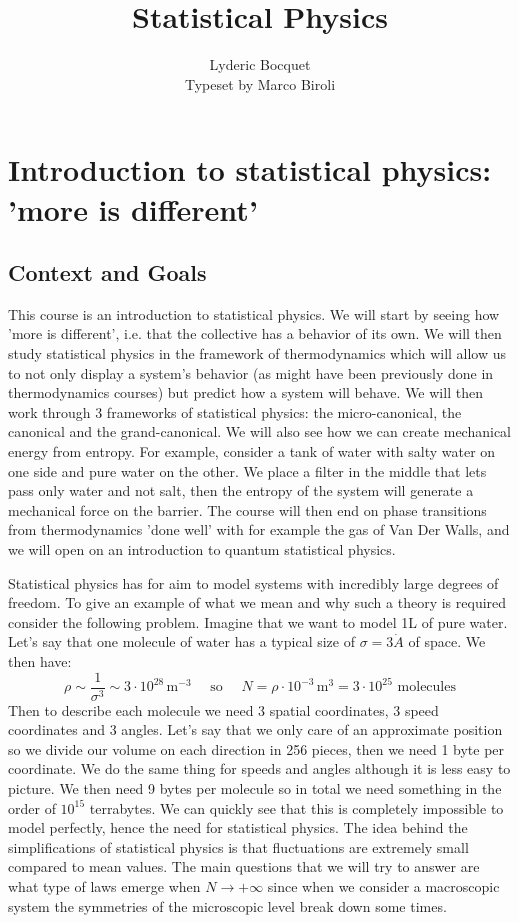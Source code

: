 \documentclass[10pt,a4paper]{book}
\author{Lyderic Bocquet\\Typeset by Marco Biroli}
\title{Statistical Physics}
\begin{document}
\maketitle

\tableofcontents

\chapter{Introduction to statistical physics: 'more is different'}
\section{Context and Goals}

This course is an introduction to statistical physics. We will start by seeing how 'more is different', i.e. that the collective has a behavior of its own. We will then study statistical physics in the framework of thermodynamics which will allow us to not only display a system's behavior (as might have been previously done in thermodynamics courses) but predict how a system will behave. We will then work through 3 frameworks of statistical physics: the micro-canonical, the canonical and the grand-canonical. We will also see how we can create mechanical energy from entropy. For example, consider a tank of water with salty water on one side and pure water on the other. We place a filter in the middle that lets pass only water and not salt, then the entropy of the system will generate a mechanical force on the barrier. The course will then end on phase transitions from thermodynamics 'done well' with for example the gas of Van Der Walls, and we will open on an introduction to quantum statistical physics.

Statistical physics has for aim to model systems with incredibly large degrees of freedom. To give an example of what we mean and why such a theory is required consider the following problem. Imagine that we want to model 1L of pure water. Let's say that one molecule of water has a typical size of $\sigma = 3\dot{A}$ of space. We then have:
\[
\rho \sim \frac{1}{\sigma^3} \sim 3 \cdot 10^{28} \, \text{m}^{-3} \quad \text{ so } \quad N = \rho \cdot 10^{-3} \, \text{m}^3 = 3 \cdot 10^{25} \text{ molecules}
\]
Then to describe each molecule we need 3 spatial coordinates, 3 speed coordinates and 3 angles. Let's say that we only care of an approximate position so we divide our volume on each direction in 256 pieces, then we need 1 byte per coordinate. We do the same thing for speeds and angles although it is less easy to picture. We then need 9 bytes per molecule so in total we need something in the order of $10^{15}$ terrabytes. We can quickly see that this is completely impossible to model perfectly, hence the need for statistical physics. The idea behind the simplifications of statistical physics is that fluctuations are extremely small compared to mean values. The main questions that we will try to answer are what type of laws emerge when $N \to +\infty$ since when we consider a macroscopic system the symmetries of the microscopic level break down some times. 
\end{document}
